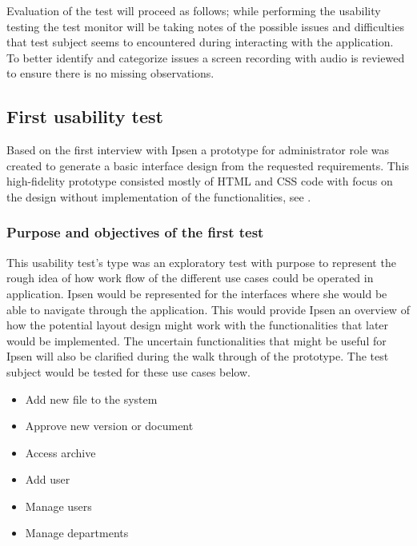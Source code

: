 Evaluation of the test will proceed as follows; while performing the usability testing the test monitor will be taking notes of the possible issues and difficulties that test subject seems to encountered during interacting with the application. 
To better identify and categorize issues a screen recording with audio is reviewed to ensure there is no missing observations.

\subsection{First usability test}\label{firsttest}
Based on the first interview with Ipsen a prototype for administrator role was created to generate a basic interface design from the requested requirements. 
This high-fidelity prototype consisted mostly of HTML and CSS code with focus on the design without implementation of the functionalities, see .

\subsubsection*{Purpose and objectives of the first test}
This usability test's type was an exploratory test with purpose to represent the rough idea of how work flow of the different use cases could be operated in application. 
Ipsen would be represented for the interfaces where she would be able to navigate through the application.
This would provide Ipsen an overview of how the potential layout design might work with the functionalities that later would be implemented. 
The uncertain functionalities that might be useful for Ipsen will also be clarified during the walk through of the prototype.
The test subject would be tested for these use cases below.

\begin{itemize}
	\item Add new file to the system
	\item Approve new version or document
	\item Access archive
	\item Add user
	\item Manage users
	\item Manage departments
\end{itemize}

